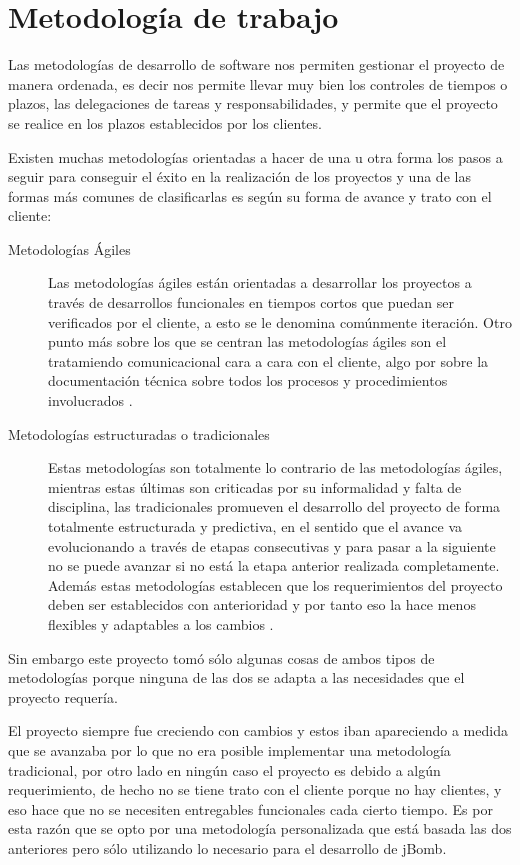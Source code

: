 \documentclass[a4paper,12pt,openany,oneside]{book}
\begin{document}
\chapter{Metodología de trabajo}
Las metodologías de desarrollo de software nos permiten gestionar el proyecto de manera ordenada, es decir nos permite llevar muy bien los controles de tiempos o plazos, las delegaciones de tareas y responsabilidades, y permite que el proyecto se realice en los plazos establecidos por los clientes.

Existen muchas metodologías orientadas a hacer de una u otra forma los pasos a seguir para conseguir el éxito en la realización de los proyectos y una de las formas más comunes de clasificarlas es según su forma de avance y trato con el cliente:
\begin{description}
\item[Metodologías Ágiles] Las metodologías ágiles están orientadas a desarrollar los proyectos a través de desarrollos funcionales en tiempos cortos que puedan ser verificados por el cliente, a esto se le denomina comúnmente iteración. Otro punto más sobre los que se centran las metodologías ágiles son el tratamiendo comunicacional cara a cara con el cliente, algo por sobre la documentación técnica sobre todos los procesos y procedimientos involucrados \cite{WIKI}.
\item[Metodologías estructuradas o tradicionales] Estas metodologías son totalmente lo contrario de las metodologías ágiles, mientras estas últimas son criticadas por su informalidad y falta de disciplina, las tradicionales promueven el desarrollo del proyecto de forma totalmente estructurada y predictiva, en el sentido que el avance va evolucionando a través de etapas consecutivas y para pasar a la siguiente no se puede avanzar si no está la etapa anterior realizada completamente. Además estas metodologías establecen que los requerimientos del proyecto deben ser establecidos con anterioridad y por tanto eso la hace menos flexibles y adaptables a los cambios \cite{WIKI}.
\end{description}
Sin embargo este proyecto tomó sólo algunas cosas de ambos tipos de metodologías porque ninguna de las dos se adapta a las necesidades que el proyecto requería. 

El proyecto siempre fue creciendo con cambios y estos iban apareciendo a medida que se avanzaba por lo que no era posible implementar una metodología tradicional, por otro lado en ningún caso el proyecto es debido a algún requerimiento, de hecho no se tiene trato con el cliente porque no hay clientes, y eso hace que no se necesiten entregables funcionales cada cierto tiempo. Es por esta razón que se opto por una metodología personalizada que está basada las dos anteriores pero sólo utilizando lo necesario para el desarrollo de jBomb.
\end{document}

